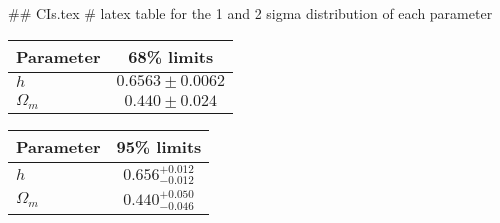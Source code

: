 ## CIs.tex
# latex table for the 1 and 2 sigma distribution of each parameter

\begin{tabular} { l  c}
 Parameter &  68\% limits\\
\hline
{\boldmath$h              $} & $0.6563\pm 0.0062          $\\
{\boldmath$\Omega_m       $} & $0.440\pm 0.024            $\\
\hline
\end{tabular}

\begin{tabular} { l  c}
 Parameter &  95\% limits\\
\hline
{\boldmath$h              $} & $0.656^{+0.012}_{-0.012}   $\\
{\boldmath$\Omega_m       $} & $0.440^{+0.050}_{-0.046}   $\\
\hline
\end{tabular}
